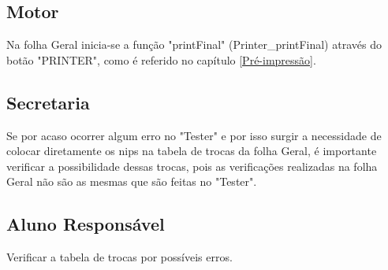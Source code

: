 \subsection{Motor}

Na folha Geral inicia-se a função "printFinal" (Printer\_printFinal) através do botão "PRINTER", como é referido no capítulo \ref{Pré-impressão}.

\subsection{Secretaria}

Se por acaso ocorrer algum erro no "Tester" e por isso surgir a necessidade de colocar diretamente os nips na tabela de trocas da folha Geral, é importante verificar a possibilidade dessas trocas, pois as verificações realizadas na folha Geral não são as mesmas que são feitas no "Tester".

\subsection{Aluno Responsável}

Verificar a tabela de trocas por possíveis erros.